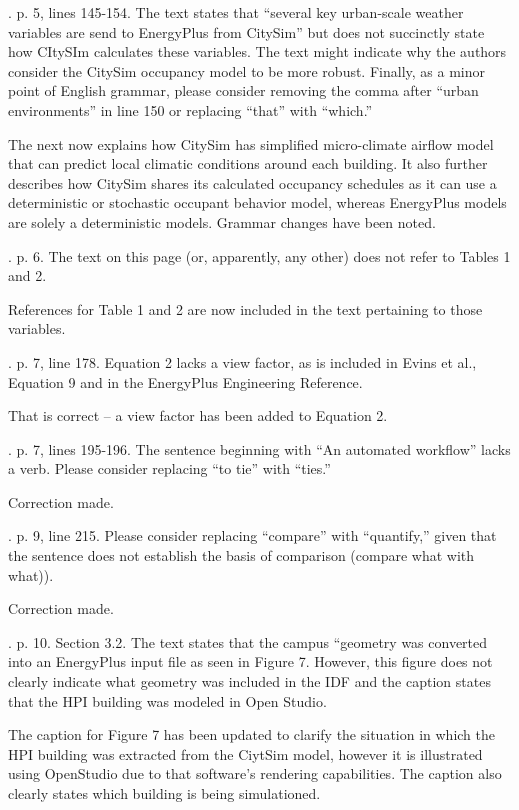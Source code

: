 \documentclass[answers,12pt]{exam}
\begin{document}
\begin{questions}
. p. 5, lines 145-154.  The text states that “several key urban-scale weather variables are send to EnergyPlus from CitySim” but does not succinctly state how CItySIm calculates these variables.  The text might indicate why the authors consider the CitySim occupancy model to be more robust.  Finally, as a minor point of English grammar, please consider removing the comma after “urban environments” in line 150 or replacing “that” with “which.” 
\begin{solution}
The next now explains how CitySim has simplified micro-climate airflow model that can predict local climatic conditions around each building. It also further describes how CitySim shares its calculated occupancy schedules as it can use a deterministic or stochastic occupant behavior model, whereas EnergyPlus models are solely a deterministic models. Grammar changes have been noted.
\end{solution}

. p. 6.  The text on this page (or, apparently, any other) does not refer to Tables 1 and 2. 
\begin{solution}
References for Table 1 and 2 are now included in the text pertaining to those variables.
\end{solution}

. p. 7, line 178.  Equation 2 lacks a view factor, as is included in Evins et al., Equation 9 and in the EnergyPlus Engineering Reference. 
\begin{solution}
That is correct -- a view factor has been added to Equation 2. 
\end{solution}

. p. 7, lines 195-196.  The sentence beginning with “An automated workflow” lacks a verb.  Please consider replacing “to tie” with “ties.” 
\begin{solution}
Correction made.
\end{solution}

. p. 9, line 215.  Please consider replacing “compare” with “quantify,” given that the sentence does not establish the basis of comparison (compare what with what)). 
\begin{solution}
Correction made.
\end{solution}

. p. 10. Section 3.2.  The text states that the campus “geometry was converted into an EnergyPlus input file as seen in Figure 7.  However, this figure does not clearly indicate what geometry was included in the IDF and the caption states that the HPI building was modeled in Open Studio.   
\begin{solution}
The caption for Figure 7 has been updated to clarify the situation in which the HPI building was extracted from the CiytSim model, however it is illustrated using
OpenStudio due to that software's rendering capabilities. The caption also clearly states which building is being simulationed.
\end{solution}


\end{questions}
\end{document}
